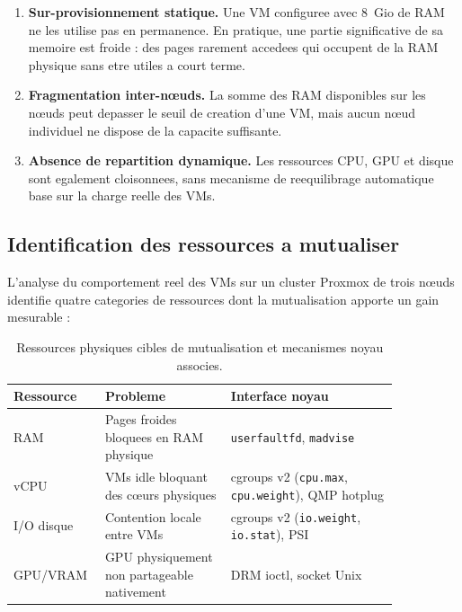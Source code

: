 \begin{enumerate}[label=(\roman*)]
    \item \textbf{Sur-provisionnement statique.} Une VM configuree avec 8~Gio de RAM ne les utilise pas en permanence. En pratique, une partie significative de sa memoire est \og froide \fg{} : des pages rarement accedees qui occupent de la RAM physique sans etre utiles a court terme.
    \item \textbf{Fragmentation inter-n\oe{}uds.} La somme des RAM disponibles sur les n\oe{}uds peut depasser le seuil de creation d'une VM, mais aucun n\oe{}ud individuel ne dispose de la capacite suffisante.
    \item \textbf{Absence de repartition dynamique.} Les ressources CPU, GPU et disque sont egalement cloisonnees, sans mecanisme de reequilibrage automatique base sur la charge reelle des VMs.
\end{enumerate}

\subsection{Identification des ressources a mutualiser}
\label{subsec:ressources-mutualiser}

L'analyse du comportement reel des VMs sur un cluster Proxmox de trois n\oe{}uds identifie quatre categories de ressources dont la mutualisation apporte un gain mesurable :

\begin{table}[htbp]
    \centering
    \caption{Ressources physiques cibles de mutualisation et mecanismes noyau associes.}
    \label{tab:ressources-cibles}
    \begin{tabular}{p{0.15\linewidth} p{0.30\linewidth} p{0.40\linewidth}}
        \toprule
        \textbf{Ressource} & \textbf{Probleme} & \textbf{Interface noyau} \\
        \midrule
        RAM & Pages froides bloquees en RAM physique & \texttt{userfaultfd}, \texttt{madvise} \\
        vCPU & VMs idle bloquant des c\oe{}urs physiques & cgroups v2 (\texttt{cpu.max}, \texttt{cpu.weight}), QMP hotplug \\
        I/O disque & Contention locale entre VMs & cgroups v2 (\texttt{io.weight}, \texttt{io.stat}), PSI \\
        GPU/VRAM & GPU physiquement non partageable nativement & DRM ioctl, socket Unix \\
        \bottomrule
    \end{tabular}
\end{table}

